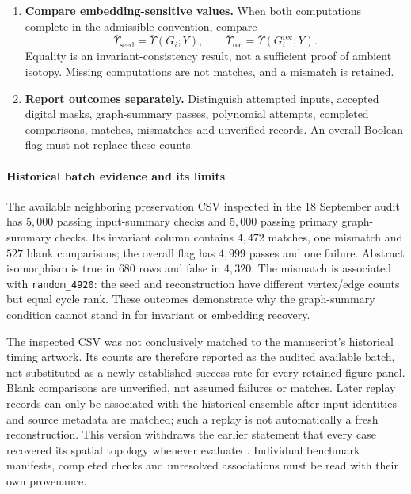 \begin{center}
{\begin{minipage}{0.92\linewidth}
\begin{enumerate}[leftmargin=*,label=\textbf{\arabic*.},itemsep=3pt,topsep=4pt]
\item \textbf{Compare embedding-sensitive values.} When both computations complete in the admissible convention, compare
\begin{equation*}
\overline{\Upsilon}_{\mathrm{seed}}=\overline{\Upsilon}(G_i;Y),\qquad
\overline{\Upsilon}_{\mathrm{rec}}=\overline{\Upsilon}(G_i^{\mathrm{rec}};Y).
\end{equation*}
Equality is an invariant-consistency result, not a sufficient proof of ambient isotopy. Missing computations are not matches, and a mismatch is retained.
\item \textbf{Report outcomes separately.} Distinguish attempted inputs, accepted digital masks, graph-summary passes, polynomial attempts, completed comparisons, matches, mismatches and unverified records. An overall Boolean flag must not replace these counts.
\end{enumerate}
\end{minipage}}
\end{center}

\paragraph{Historical batch evidence and its limits}
The available neighboring preservation CSV inspected in the 18 September audit has $5{,}000$ passing input-summary checks and $5{,}000$ passing primary graph-summary checks. Its invariant column contains $4{,}472$ matches, one mismatch and $527$ blank comparisons; the overall flag has $4{,}999$ passes and one failure. Abstract isomorphism is true in $680$ rows and false in $4{,}320$. The mismatch is associated with \texttt{random\_4920}: the seed and reconstruction have different vertex/edge counts but equal cycle rank. These outcomes demonstrate why the graph-summary condition cannot stand in for invariant or embedding recovery.

The inspected CSV was not conclusively matched to the manuscript's historical timing artwork. Its counts are therefore reported as the audited available batch, not substituted as a newly established success rate for every retained figure panel. Blank comparisons are unverified, not assumed failures or matches. Later replay records can only be associated with the historical ensemble after input identities and source metadata are matched; such a replay is not automatically a fresh reconstruction. This version withdraws the earlier statement that every case recovered its spatial topology whenever evaluated. Individual benchmark manifests, completed checks and unresolved associations must be read with their own provenance.

